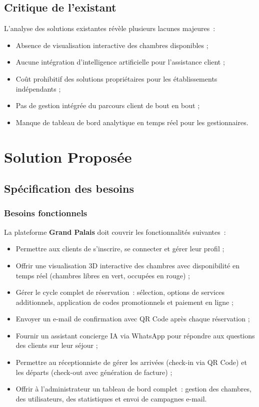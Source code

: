 \documentclass[12pt, a4paper]{report}
\begin{document}
\subsection{Critique de l'existant}

L'analyse des solutions existantes révèle plusieurs lacunes majeures~:
\begin{itemize}
  \item Absence de visualisation interactive des chambres disponibles ;
  \item Aucune intégration d'intelligence artificielle pour l'assistance client ;
  \item Coût prohibitif des solutions propriétaires pour les établissements indépendants ;
  \item Pas de gestion intégrée du parcours client de bout en bout ;
  \item Manque de tableau de bord analytique en temps réel pour les gestionnaires.
\end{itemize}

\section{Solution Proposée}

\subsection{Spécification des besoins}

\subsubsection{Besoins fonctionnels}

La plateforme \textbf{Grand Palais} doit couvrir les fonctionnalités suivantes~:
\begin{itemize}
  \item Permettre aux clients de s'inscrire, se connecter et gérer leur profil ;
  \item Offrir une visualisation 3D interactive des chambres avec disponibilité
        en temps réel (chambres libres en vert, occupées en rouge) ;
  \item Gérer le cycle complet de réservation~: sélection, options de services
        additionnels, application de codes promotionnels et paiement en ligne ;
  \item Envoyer un e-mail de confirmation avec QR Code après chaque réservation ;
  \item Fournir un assistant concierge IA via WhatsApp pour répondre aux questions
        des clients sur leur séjour ;
  \item Permettre au réceptionniste de gérer les arrivées (check-in via QR Code)
        et les départs (check-out avec génération de facture) ;
  \item Offrir à l'administrateur un tableau de bord complet~: gestion des chambres,
        des utilisateurs, des statistiques et envoi de campagnes e-mail.
\end{itemize}
\end{document}
